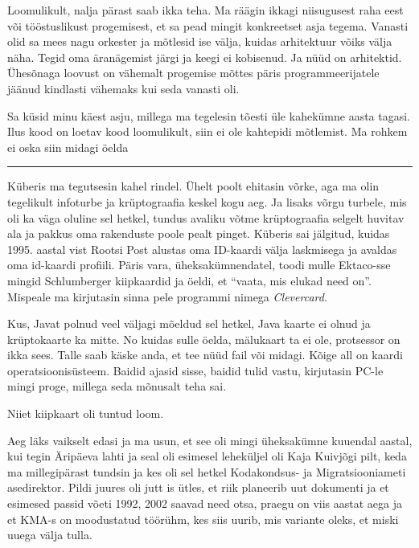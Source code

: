 
Loomulikult, nalja pärast saab ikka teha. Ma räägin ikkagi niisugusest raha 
eest või tööstuslikust progemisest, et sa pead mingit konkreetset asja tegema. 
Vanasti olid sa mees nagu orkester ja mõtlesid ise välja, kuidas arhitektuur 
võiks välja näha. Tegid  oma äranägemist järgi ja keegi ei kobisenud. Ja nüüd 
on arhitektid. Ühesõnaga loovust on vähemalt progemise mõttes päris 
programmeerijatele jäänud kindlasti vähemaks kui seda vanasti oli. 


Sa küsid minu käest asju, millega ma tegelesin tõesti üle kahekümne aasta 
tagasi. Ilus kood on loetav kood loomulikult, siin ei ole kahtepidi mõtlemist. 
Ma rohkem ei oska siin midagi öelda

\bigskip
\noindent\rule{.3\textwidth}{.7pt}
\bigskip


Küberis ma tegutsesin kahel rindel. Ühelt poolt ehitasin võrke, 
aga ma olin tegelikult infoturbe ja krüptograafia keskel kogu aeg. Ja lisaks 
võrgu turbele, mis oli ka väga oluline sel hetkel, tundus avaliku võtme 
krüptograafia selgelt huvitav ala ja pakkus oma rakenduste poole pealt pinget. 
Küberis sai jälgitud, kuidas 1995. aastal vist Rootsi Post alustas oma 
ID-kaardi välja laskmisega ja avaldas oma id-kaardi profiili.  Päris vara, 
üheksakümnendatel, toodi mulle Ektaco-sse mingid Schlumberger 
kiipkaardid ja öeldi, et \enquote{vaata, mis elukad need on}. Mispeale ma 
kirjutasin sinna pele programmi nimega \emph{Clevercard}.


Kus, Javat polnud veel väljagi mõeldud sel hetkel, Java kaarte  ei olnud ja 
krüptokaarte ka mitte. No kuidas sulle öelda, mälukaart ta ei ole,  protsessor 
on ikka sees. Talle saab käske anda, et tee nüüd fail või midagi. Kõige all on 
kaardi operatsioonisüsteem. Baidid ajasid sisse, baidid tulid vastu, kirjutasin 
PC-le  mingi proge, millega seda mõnusalt teha sai. 

Niiet kiipkaart oli tuntud loom. 

Aeg läks vaikselt edasi ja ma usun, et see oli mingi üheksakümne kuuendal 
aastal, kui tegin Äripäeva lahti ja seal oli esimesel leheküljel oli Kaja 
Kuivjõgi pilt, keda ma millegipärast tundsin ja kes 
oli sel hetkel Kodakondsus- ja Migratsiooniameti asedirektor. Pildi juures oli jutt is ütles, et riik 
planeerib uut dokumenti ja et esimesed passid võeti 1992, 2002 saavad need 
otsa, praegu on viis aastat aega ja et KMA-s on moodustatud töörühm, kes siis 
uurib, mis variante oleks, et miski uuega välja tulla. 

